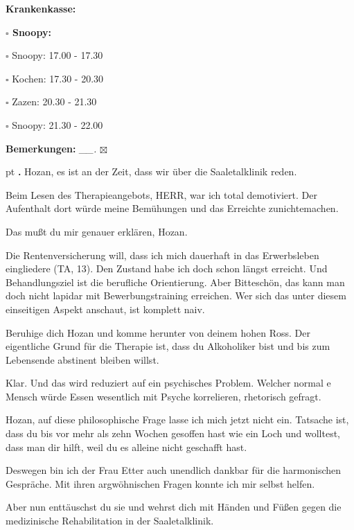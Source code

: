 \documentclass[10pt,a4paper]{article}
\newcounter{notec}
\newcommand\notep[1]{%
  \stepcounter{notec}
  \vskip #1pt
  {\bf\arabic{notec}.}
}
\newcommand\prop[1] {{\color {alizarin} {\bf #1}}}             %
\newcommand\mand[1] {{\color {burntorange} {\bf #1}}}          %
\newcommand\bottomspace{\vskip 4pt}
\newcommand\n[1] { {\sl #1.} \hskip 5pt }
\begin{document}
\begin{mdframed}[style=daystyle]
\begin{labeling}{{\mand {Krankenkasse:}}}
\begin{minipage}{0.75\textwidth}
\begin{labeling}{\prop {$\square$ {Snoopy:}}}
      \item[$\square$ Snoopy:] 17.00 - 17.30
      \item[$\square$ Kochen:] 17.30 - 20.30
        
      \item[$\square$ Zazen:]  20.30 - 21.30
      \item[$\square$ Snoopy:] 21.30 - 22.00
      \end{labeling}
    \end{minipage}
    \bottomspace
  \item[{\mand {Bemerkungen:}}]  \n{\_\_} $\boxtimes$
  \end{labeling}
    
  \setcounter{notec}{0}
  
  \notep 0 Hozan, es ist an der Zeit, dass wir über die Saaletalklinik reden.

  \vskip 2pt
  Beim Lesen des Therapieangebots, HERR, war ich total demotiviert. Der
  Aufenthalt dort würde meine Bemühungen und das Erreichte zunichtemachen.

  \vskip 2pt
  Das mußt du mir genauer erklären, Hozan.

  \vskip 2pt
  Die Rentenversicherung will, dass ich mich dauerhaft in das Erwerbsleben
  eingliedere (TA, 13). Den Zustand habe ich doch schon längst erreicht. Und
  Behandlungsziel ist die berufliche Orientierung. Aber Bitteschön, das kann man
  doch nicht lapidar mit Bewerbungstraining erreichen. Wer sich das unter diesem
  einseitigen Aspekt anschaut, ist komplett naiv.

  \vskip 2pt
  Beruhige dich Hozan und komme herunter von deinem hohen Ross. Der eigentliche
  Grund für die Therapie ist, dass du Alkoholiker bist und bis zum Lebensende
  abstinent bleiben willst.

  \vskip 2pt
  Klar. Und das wird reduziert auf ein psychisches Problem. Welcher normal
  e Mensch würde Essen wesentlich mit Psyche korrelieren, rhetorisch gefragt.

  \vskip 2pt
  Hozan, auf diese philosophische Frage lasse ich mich jetzt nicht ein. Tatsache
  ist, dass du bis vor mehr als zehn Wochen gesoffen hast wie ein Loch und
  wolltest, dass man dir hilft, weil du es alleine nicht geschafft hast.

  \vskip 2pt
  Deswegen bin ich der Frau Etter auch unendlich dankbar für die harmonischen
  Gespräche. Mit ihren argwöhnischen Fragen konnte ich mir selbst helfen.

  \vskip 2pt
  Aber nun enttäuschst du sie und wehrst dich mit Händen und Füßen gegen die
  medizinische Rehabilitation in der Saaletalklinik.


\end{mdframed}
\end{document}
